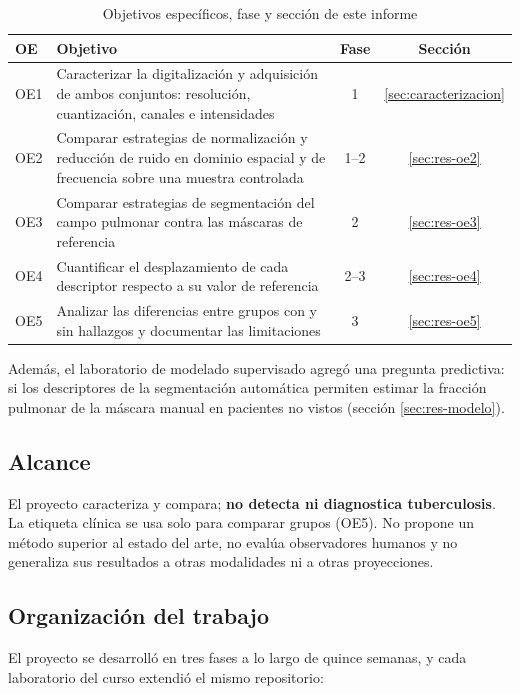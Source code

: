 \begin{table}[H]
\centering
\small
\caption{Objetivos específicos, fase y sección de este informe}
\begin{tabular}{@{}p{0.9cm}p{9.6cm}cc@{}}
\toprule
\textbf{OE} & \textbf{Objetivo} & \textbf{Fase} & \textbf{Sección} \\
\midrule
OE1 & Caracterizar la digitalización y adquisición de ambos conjuntos: resolución,
      cuantización, canales e intensidades & 1 & \ref{sec:caracterizacion} \\
OE2 & Comparar estrategias de normalización y reducción de ruido en dominio
      espacial y de frecuencia sobre una muestra controlada & 1--2 & \ref{sec:res-oe2} \\
OE3 & Comparar estrategias de segmentación del campo pulmonar contra las máscaras
      de referencia & 2 & \ref{sec:res-oe3} \\
OE4 & Cuantificar el desplazamiento de cada descriptor respecto a su valor de
      referencia & 2--3 & \ref{sec:res-oe4} \\
OE5 & Analizar las diferencias entre grupos con y sin hallazgos y documentar las
      limitaciones & 3 & \ref{sec:res-oe5} \\
\bottomrule
\end{tabular}
\end{table}

Además, el laboratorio de modelado supervisado agregó una pregunta predictiva:
si los descriptores de la segmentación automática permiten estimar la fracción
pulmonar de la máscara manual en pacientes no vistos (sección \ref{sec:res-modelo}).

\subsection{Alcance}

El proyecto caracteriza y compara; \textbf{no detecta ni diagnostica tuberculosis}.
La etiqueta clínica se usa solo para comparar grupos (OE5). No propone un método
superior al estado del arte, no evalúa observadores humanos y no generaliza sus
resultados a otras modalidades ni a otras proyecciones.

\subsection{Organización del trabajo}

El proyecto se desarrolló en tres fases a lo largo de quince semanas, y cada
laboratorio del curso extendió el mismo repositorio:

